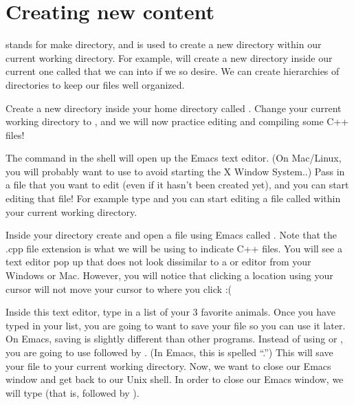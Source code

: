 \documentclass{tufte-handout}
\begin{document}
\section{Creating new content}

 stands for make directory, and is used to create a new
directory within our current working directory. For example,
 will create a new directory inside our
current one called  that we can  into
if we so desire. We can create hierarchies of directories to keep our
files well organized.

Create a new directory inside your home directory called
. Change your current working directory to
, and we will now practice editing and compiling
some C++ files!

The  command in the shell will open up the Emacs text%
 editor. (On Mac/Linux, you will probably want to
use  to avoid starting the X Window System..) Pass in
a file that you want to edit (even if it hasn't been created yet), and
you can start editing that file! For example type  and you can start editing a file called
 within your current working directory.

Inside your  directory create and open a file
using Emacs called . Note that the .cpp file
extension is what we will be using to indicate C++ files. You will see a
text editor pop up that does not look dissimilar to a
 or  editor from your
Windows or Mac. However, you will notice that clicking a location using
your cursor will not move your cursor to where you click :(

Inside this text editor, type in a list of your 3 favorite animals. Once
you have typed in your list, you are going to want to save your file so
you can use it later. On Emacs, saving is slightly different than other
programs. Instead of using  or , you
are going to use  followed by
.
(In Emacs, this is spelled ``.'') This will save your
file to your current working directory. Now, we want to close our Emacs
window and get back to our Unix shell. In order to close our Emacs
window, we will type  (that is, 
followed by ).
\end{document}
